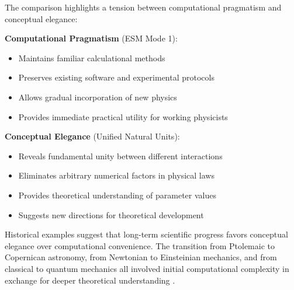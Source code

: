 	The comparison highlights a tension between computational pragmatism and conceptual elegance:
	
	\textbf{Computational Pragmatism} (ESM Mode 1):
	\begin{itemize}
		\item Maintains familiar calculational methods
		\item Preserves existing software and experimental protocols
		\item Allows gradual incorporation of new physics
		\item Provides immediate practical utility for working physicists
	\end{itemize}
	
	\textbf{Conceptual Elegance} (Unified Natural Units):
	\begin{itemize}
		\item Reveals fundamental unity between different interactions
		\item Eliminates arbitrary numerical factors in physical laws
		\item Provides theoretical understanding of parameter values
		\item Suggests new directions for theoretical development
	\end{itemize}
	
	Historical examples suggest that long-term scientific progress favors conceptual elegance over computational convenience. The transition from Ptolemaic to Copernican astronomy, from Newtonian to Einsteinian mechanics, and from classical to quantum mechanics all involved initial computational complexity in exchange for deeper theoretical understanding \cite{Kuhn1962}.
	
